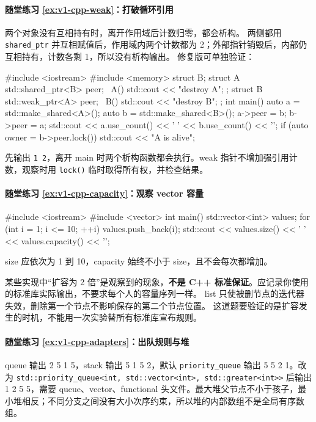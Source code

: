 \paragraph*{随堂练习 \ref{ex:v1-cpp-weak}：打破循环引用}
\begin{solution}
两个对象没有互相持有时，离开作用域后计数归零，都会析构。
两侧都用 \texttt{shared\_ptr} 并互相赋值后，作用域内两个计数都为 2；外部指针销毁后，内部仍互相持有，计数各剩 1，所以没有析构输出。
修复版可单独验证：
\begin{tcpp}
#include <iostream>
#include <memory>
struct B;
struct A {
    std::shared_ptr<B> peer;
    ~A() { std::cout << "destroy A\n"; }
};
struct B {
    std::weak_ptr<A> peer;
    ~B() { std::cout << "destroy B\n"; }
};
int main() {
    auto a = std::make_shared<A>();
    auto b = std::make_shared<B>();
    a->peer = b;
    b->peer = a;
    std::cout << a.use_count() << ' ' << b.use_count() << '\n';
    if (auto owner = b->peer.lock()) {
        std::cout << "A is alive\n";
    }
}
\end{tcpp}
先输出 \texttt{1 2}，离开 main 时两个析构函数都会执行。weak 指针不增加强引用计数，观察时用 \texttt{lock()} 临时取得所有权，并检查结果。
\end{solution}

\paragraph*{随堂练习 \ref{ex:v1-cpp-capacity}：观察 vector 容量}
\begin{solution}
\begin{tcpp}
#include <iostream>
#include <vector>
int main() {
    std::vector<int> values;
    for (int i = 1; i <= 10; ++i) {
        values.push_back(i);
        std::cout << values.size() << ' ' << values.capacity() << '\n';
    }
}
\end{tcpp}
size 应依次为 1 到 10，capacity 始终不小于 size，且不会每次都增加。
\begin{note}
某些实现中“扩容为 2 倍”是观察到的现象，\textbf{不是 C++ 标准保证}。应记录你使用的标准库实际输出，不要求每个人的容量序列一样。
list 只使被删节点的迭代器失效，删除第一个节点不影响保存的第二个节点位置。
这道题要验证的是扩容发生的时机，不能用一次实验替所有标准库宣布规则。
\end{note}
\end{solution}

\paragraph*{随堂练习 \ref{ex:v1-cpp-adapters}：出队规则与堆}
\begin{solution}
queue 输出 2 5 1 5，stack 输出 5 1 5 2，默认 \texttt{priority\_queue} 输出 5 5 2 1。改为 \texttt{std::priority\_queue<int, std::vector<int>, std::greater<int>>} 后输出 1 2 5 5，需要 queue、vector、functional 头文件。最大堆父节点不小于孩子，最小堆相反；不同分支之间没有大小次序约束，所以堆的内部数组不是全局有序数组。
\end{solution}
